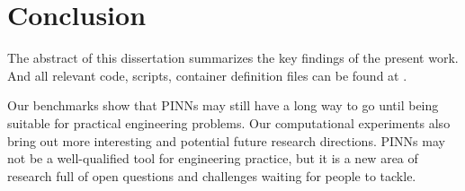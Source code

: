 \section{Conclusion}

The abstract of this dissertation summarizes the key findings of the present work.
And all relevant code, scripts, container definition files can be found at \cite{chuang_dissertation_nodate}.

Our benchmarks show that PINNs may still have a long way to go until being suitable for practical engineering problems.
Our computational experiments also bring out more interesting and potential future research directions.
PINNs may not be a well-qualified tool for engineering practice, but it is a new area of research full of open questions and challenges waiting for people to tackle.

